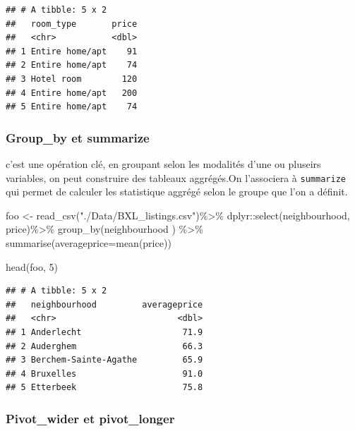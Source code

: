 \documentclass[
]{book}
\newenvironment{Shaded}{\begin{snugshade}}{\end{snugshade}}
\newcommand{\AttributeTok}[1]{\textcolor[rgb]{0.77,0.63,0.00}{#1}}
\newcommand{\DecValTok}[1]{\textcolor[rgb]{0.00,0.00,0.81}{#1}}
\newcommand{\FunctionTok}[1]{\textcolor[rgb]{0.00,0.00,0.00}{#1}}
\newcommand{\NormalTok}[1]{#1}
\newcommand{\OtherTok}[1]{\textcolor[rgb]{0.56,0.35,0.01}{#1}}
\newcommand{\SpecialCharTok}[1]{\textcolor[rgb]{0.00,0.00,0.00}{#1}}
\newcommand{\StringTok}[1]{\textcolor[rgb]{0.31,0.60,0.02}{#1}}
\begin{document}
\begin{verbatim}
## # A tibble: 5 x 2
##   room_type       price
##   <chr>           <dbl>
## 1 Entire home/apt    91
## 2 Entire home/apt    74
## 3 Hotel room        120
## 4 Entire home/apt   200
## 5 Entire home/apt    74
\end{verbatim}

\hypertarget{group_by-et-summarize}{%
\subsubsection{Group\_by et summarize}\label{group_by-et-summarize}}

c'est une opération clé, en groupant selon les modalités d'une ou pluseirs variables, on peut construire des tableaux aggrégés.On l'associera à \texttt{summarize} qui permet de calculer les statistique aggrégé selon le groupe que l'on a définit.

\begin{Shaded}
\begin{Highlighting}[]
\NormalTok{foo }\OtherTok{\textless{}{-}} \FunctionTok{read\_csv}\NormalTok{(}\StringTok{"./Data/BXL\_listings.csv"}\NormalTok{)}\SpecialCharTok{\%\textgreater{}\%} 
\NormalTok{  dplyr}\SpecialCharTok{::}\FunctionTok{select}\NormalTok{(neighbourhood, price)}\SpecialCharTok{\%\textgreater{}\%}
    \FunctionTok{group\_by}\NormalTok{(neighbourhood ) }\SpecialCharTok{\%\textgreater{}\%} 
  \FunctionTok{summarise}\NormalTok{(}\AttributeTok{averageprice=}\FunctionTok{mean}\NormalTok{(price)) }

\FunctionTok{head}\NormalTok{(foo, }\DecValTok{5}\NormalTok{)}
\end{Highlighting}
\end{Shaded}

\begin{verbatim}
## # A tibble: 5 x 2
##   neighbourhood         averageprice
##   <chr>                        <dbl>
## 1 Anderlecht                    71.9
## 2 Auderghem                     66.3
## 3 Berchem-Sainte-Agathe         65.9
## 4 Bruxelles                     91.0
## 5 Etterbeek                     75.8
\end{verbatim}

\hypertarget{pivot_wider-et-pivot_longer}{%
\subsubsection{Pivot\_wider et pivot\_longer}\label{pivot_wider-et-pivot_longer}}
\end{document}
